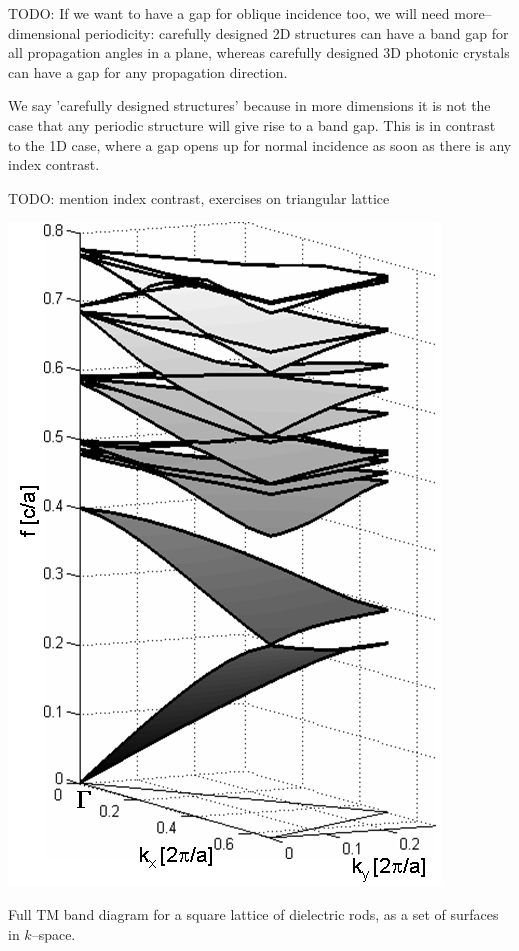 

TODO: If we want to have a gap for oblique incidence too, we will need more--dimensional periodicity: carefully designed 2D structures can have a band gap for all propagation angles in a plane, whereas carefully designed 3D photonic crystals can have a gap for any propagation direction.

We say 'carefully designed structures' because in more dimensions it is not the case that any periodic structure will give rise to a band gap. This is in contrast to the 1D case, where a gap opens up for normal incidence as soon as there is any index contrast.

TODO: mention index contrast, exercises on triangular lattice

\begin{marginfigure}
\centering
\includegraphics{symmetry/figures/3d_bands}
\caption{Full TM band diagram for a square lattice of dielectric rods, as a set of surfaces in $k$--space.}
\label{fig-bands-rods-3D}
\end{marginfigure}


